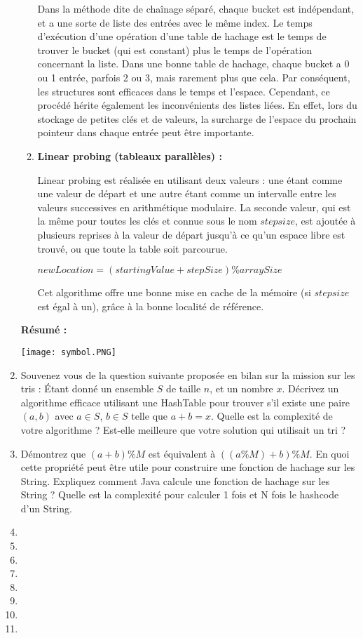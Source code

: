 \documentclass[11pt]{article}
\begin{document}
\begin{enumerate}
\begin{enumerate}
Dans la méthode dite de chaînage séparé, chaque bucket est indépendant, et a une sorte de liste des entrées avec le même index. Le temps d'exécution d'une opération d'une table de hachage est le temps de trouver le bucket (qui est constant) plus le temps de l'opération concernant la liste. Dans une bonne table de hachage, chaque bucket a 0 ou 1 entrée, parfois 2 ou 3, mais rarement plus que cela. Par conséquent, les structures sont efficaces dans le temps et l'espace. Cependant, ce procédé hérite également les inconvénients des listes liées. En effet, lors du stockage de petites clés et de valeurs, la surcharge de l'espace du prochain pointeur dans chaque entrée peut être importante. 

\item \textbf{Linear probing (tableaux parallèles) :}

Linear probing est réalisée en utilisant deux valeurs : une étant comme une valeur de départ et une autre étant comme un intervalle entre les valeurs successives en arithmétique modulaire. La seconde valeur, qui est la même pour toutes les clés et connue sous le nom $stepsize$, est ajoutée à plusieurs reprises à la valeur de départ jusqu'à ce qu'un espace libre est trouvé, ou que toute la table soit parcourue.
\begin{center}
$newLocation = (startingValue + stepSize) \% arraySize$
\end{center}
Cet algorithme offre une bonne mise en cache de la mémoire (si $stepsize$ est égal à un), grâce à la bonne localité de référence.\\
\end{enumerate}
\textbf{Résumé :}
\begin{center}
\texttt{[image: symbol.PNG]}
\end{center}
\item Souvenez vous de la question suivante proposée en bilan sur la mission sur les
tris : Étant donné un ensemble $S$ de taille $n$, et un nombre $x$. Décrivez un algorithme
efficace utilisant une HashTable pour trouver s’il existe une paire $(a, b)$
avec $a \in S$, $b \in S$ telle que $a + b = x$. Quelle est la complexité de votre algorithme
? Est-elle meilleure que votre solution qui utilisait un tri ?
\item Démontrez que $(a + b)\%M$ est équivalent à $((a\%M) + b)\%M$. En quoi cette 
propriété peut être utile pour construire une fonction de hachage sur les String.
Expliquez comment Java calcule une fonction de hachage sur les String ? Quelle
est la complexité pour calculer 1 fois et N fois le hashcode d’un String.
\item
\item 
\item 
\item
\item 
\item 
\item
\item 


\end{enumerate}
\end{document}
